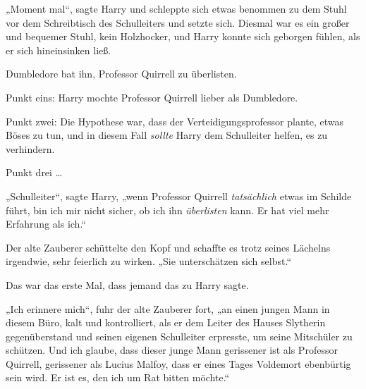 „Moment mal“, sagte Harry und schleppte sich etwas benommen zu dem Stuhl vor dem Schreibtisch des Schulleiters und setzte sich. Diesmal war es ein großer und bequemer Stuhl, kein Holzhocker, und Harry konnte sich geborgen fühlen, als er sich hineinsinken ließ.

Dumbledore bat ihn, Professor Quirrell zu überlisten.

Punkt eins: Harry mochte Professor Quirrell lieber als Dumbledore.

Punkt zwei: Die Hypothese war, dass der Verteidigungsprofessor plante, etwas Böses zu tun, und in diesem Fall \emph{sollte} Harry dem Schulleiter helfen, es zu verhindern.

Punkt drei …

„Schulleiter“, sagte Harry, „wenn Professor Quirrell \emph{tatsächlich} etwas im Schilde führt, bin ich mir nicht sicher, ob ich ihn \emph{überlisten} kann. Er hat viel mehr Erfahrung als ich.“

Der alte Zauberer schüttelte den Kopf und schaffte es trotz seines Lächelns irgendwie, sehr feierlich zu wirken.
„Sie unterschätzen sich selbst.“

Das war das erste Mal, dass jemand das zu Harry sagte.

„Ich erinnere mich“, fuhr der alte Zauberer fort, „an einen jungen Mann in diesem Büro, kalt und kontrolliert, als er dem Leiter des Hauses Slytherin gegenüberstand und seinen eigenen Schulleiter erpresste, um seine Mitschüler zu schützen. Und ich glaube, dass dieser junge Mann gerissener ist als Professor Quirrell, gerissener als Lucius Malfoy, dass er eines Tages Voldemort ebenbürtig sein wird. Er ist es, den ich um Rat bitten möchte.“

